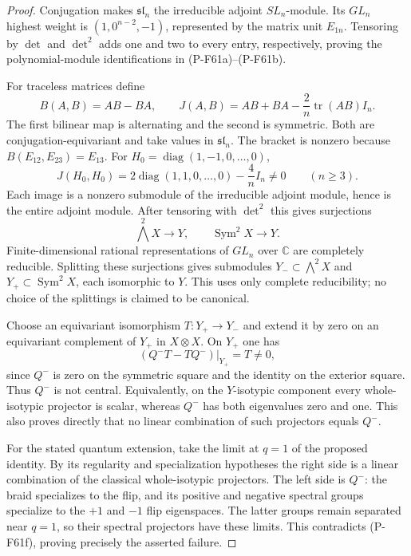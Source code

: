 \begin{proof}
Conjugation makes $\mathfrak{sl}_n$ the irreducible adjoint
$SL_n$-module.  Its $GL_n$ highest weight is
$(1,0^{n-2},-1)$, represented by the matrix unit $E_{1n}$.
Tensoring by $\det$ and $\det^2$ adds one and two to every
entry, respectively, proving the polynomial-module
identifications in (P-F61a)--(P-F61b).

For traceless matrices define
\[
 B(A,B)=AB-BA,\qquad
 J(A,B)=AB+BA-\frac2n\operatorname{tr}(AB)I_n.
                                                               \tag{P-F61c}
\]
The first bilinear map is alternating and the second is
symmetric.  Both are conjugation-equivariant and take values
in $\mathfrak{sl}_n$.  The bracket is nonzero because
$B(E_{12},E_{23})=E_{13}$.
For $H_0=\operatorname{diag}(1,-1,0,\ldots,0)$,
\[
 J(H_0,H_0)=2\operatorname{diag}(1,1,0,\ldots,0)
                            -\frac4nI_n\ne0
          \qquad(n\ge3).
                                                               \tag{P-F61d}
\]
Each image is a nonzero submodule of the irreducible adjoint
module, hence is the entire adjoint module.  After tensoring
with $\det^2$ this gives surjections
\[
 \bigwedge^2X\longrightarrow Y,
       \qquad \operatorname{Sym}^2X\longrightarrow Y.
                                                               \tag{P-F61e}
\]
Finite-dimensional rational representations of $GL_n$ over
$\mathbb C$ are completely reducible.  Splitting these
surjections gives submodules $Y_-\subset\bigwedge^2X$ and
$Y_+\subset\operatorname{Sym}^2X$, each isomorphic to $Y$.
This uses only complete reducibility; no choice of the
splittings is claimed to be canonical.

Choose an equivariant isomorphism $T:Y_+\to Y_-$ and extend
it by zero on an equivariant complement of $Y_+$ in
$X\otimes X$.  On $Y_+$ one has
\[
           (Q^-T-TQ^-)\big|_{Y_+}=T\ne0,
                                                               \tag{P-F61f}
\]
since $Q^-$ is zero on the symmetric square and the identity
on the exterior square.  Thus $Q^-$ is not central.  Equivalently,
on the $Y$-isotypic component every whole-isotypic projector
is scalar, whereas $Q^-$ has both eigenvalues zero and one.
This also proves directly that no linear combination of
such projectors equals $Q^-$.

For the stated quantum extension, take the limit at $q=1$
of the proposed identity.  By its regularity and specialization
hypotheses the right side is a linear combination of the
classical whole-isotypic projectors.  The left side is $Q^-$:
the braid specializes to the flip, and its positive and negative
spectral groups specialize to the $+1$ and $-1$ flip eigenspaces.
The latter groups remain separated near $q=1$, so their
spectral projectors have these limits.  This contradicts
(P-F61f), proving precisely the asserted failure.
\end{proof}

